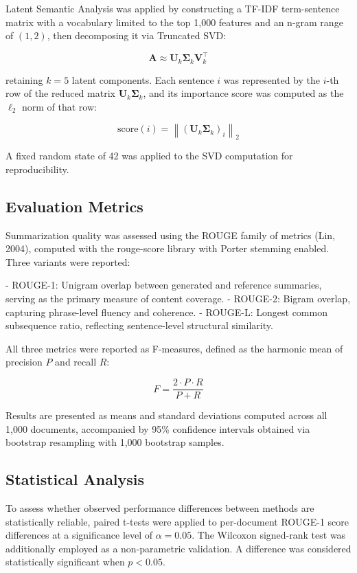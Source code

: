 \documentclass[12pt,twoside,en,win]{bmzhart}
\begin{document}
	Latent Semantic Analysis was applied by constructing a TF-IDF term-sentence matrix with a vocabulary limited to the 
	top 1,000 features and an n-gram range of $(1, 2)$, then decomposing it via Truncated SVD:

	$$\mathbf{A} \approx \mathbf{U}_k \boldsymbol{\Sigma}_k \mathbf{V}_k^\top$$

	retaining $k = 5$ latent components. Each sentence $i$ was represented by the $i$-th row of the reduced matrix 
	$\mathbf{U}_k \boldsymbol{\Sigma}_k$, and its importance score was computed as the $\ell_2$ norm of that row:

	$$\text{score}(i) = \left\| (\mathbf{U}_k \boldsymbol{\Sigma}_k)_i \right\|_2$$

	A fixed random state of 42 was applied to the SVD computation for reproducibility.

	\subsection{Evaluation Metrics}

	Summarization quality was assessed using the ROUGE family of metrics (Lin, 2004), computed with the rouge-score 
	library with Porter stemming enabled. Three variants were reported:

	- ROUGE-1: Unigram overlap between generated and reference summaries, serving as the primary measure of content coverage.
	- ROUGE-2: Bigram overlap, capturing phrase-level fluency and coherence.
	- ROUGE-L: Longest common subsequence ratio, reflecting sentence-level structural similarity.

	All three metrics were reported as F-measures, defined as the harmonic mean of precision $P$ and recall $R$:

	$$F = \frac{2 \cdot P \cdot R}{P + R}$$

	Results are presented as means and standard deviations computed across all 1,000 documents, accompanied by 95\% 
	confidence intervals obtained via bootstrap resampling with 1,000 bootstrap samples.

	\subsection{Statistical Analysis}

	To assess whether observed performance differences between methods are statistically reliable, paired t-tests 
	were applied to per-document ROUGE-1 score differences at a significance level of $\alpha = 0.05$. The Wilcoxon 
	signed-rank test was additionally employed as a non-parametric validation. A difference was considered 
	statistically significant when $p < 0.05$.
\end{document}
